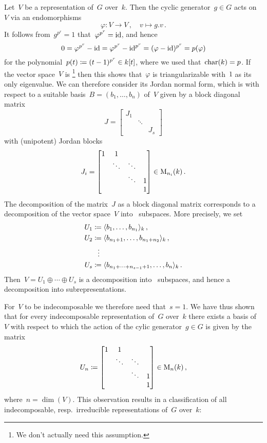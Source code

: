 Let~$V$ be a representation of~$G$ over~$k$.
Then the cyclic generator~$g \in G$ acts on~$V$ via an endomorphisms
\[
          \varphi
  \colon  V
  \to     V \,,
  \quad   v
  \mapsto g.v \,.
\]
It follows from~$g^{p^r} = 1$ that~$\varphi^{p^r} = \operatorname{id}$, and hence
\[
    0
  = \varphi^{p^r} - \operatorname{id}
  = \varphi^{p^r} - \operatorname{id}^{p^r}
  = (\varphi - \operatorname{id})^{p^r}
  = p(\varphi)
\]
for the polynomial~$p(t) \coloneqq (t-1)^{p^r} \in k[t]$, where we used that~$\operatorname{char}(k) = p$.
If the vector space~$V$ is {\fd}\footnote{We don’t actually need this assumption.} then this shows that~$\varphi$ is triangularizable with~$1$ as its only eigenvalue.
We can therefore consider its Jordan normal form, which is with respect to a suitable basis~$B = (b_1, \dotsc, b_n)$ of~$V$ given by a block diagonal matrix
\[
    J
  = \begin{bmatrix}
      J_1 &         &       \\
          & \ddots  &       \\
          &         & J_s
    \end{bmatrix}
\]
with (unipotent) Jordan blocks
\[
    J_i
  = \begin{bmatrix}
      1 &       1 &         &   \\
        & \ddots  & \ddots  &   \\
        &         & \ddots  & 1 \\
        &         &         & 1
    \end{bmatrix}
  \in \operatorname{M}_{n_i}(k) \,.
\]
The decomposition of the matrix~$J$ as a block diagonal matrix corresponds to a decomposition of the vector space~$V$ into~ subspaces.
More precisely, we set
\begin{align*}
            U_1
  &\coloneqq \langle b_1, \dotsc, b_{n_1}\rangle_k  \,, \\
            U_2
  &\coloneqq \langle b_{n_1 + 1}, \dotsc, b_{n_1 + n_2}\rangle_k \,,  \\
  &\;\;\,\vdots  \\
            U_s
  &\coloneqq \langle b_{n_1 + \dotsb + n_{s-1} + 1}, \dotsc, b_n\rangle_k \,.
\end{align*}
Then~$V = U_1 \oplus \dotsb \oplus U_s$ is a decomposition into~ subspaces, and hence a decomposition into subrepresentations.

For~$V$ to be indecomposable we therefore need that~$s = 1$.
We have thus shown that for every {\fd} indecomposable representation of~$G$ over~$k$ there exists a basis of~$V$ with respect to which the action of the cylic generator~$g \in G$ is given by the matrix
\[
  U_n
  \coloneqq
  \begin{bmatrix}
    1 &       1 &         &   \\
      & \ddots  & \ddots  &   \\
      &         & \ddots  & 1 \\
      &         &         & 1
  \end{bmatrix}
  \in \operatorname{M}_{n}(k) \,,
\]
where~$n = \dim(V)$.
This observation results in a classification of all~{\fd} indecomposable, resp.\ irreducible representations of~$G$ over~$k$:



